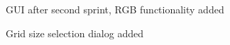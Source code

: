\documentclass[11pt]{article} %
\begin{document}
  \begin{figure}[H]
  	\centering
  	\caption{GUI after second sprint, RGB functionality added}
  	\label{fig:GUI Design 2}
  \end{figure}  
  
  \begin{figure}[H]
  	\centering
  	\caption{Grid size selection dialog added}
  	\label{fig:GUI Design 2 dialog}
  \end{figure}
  
\end{document}
